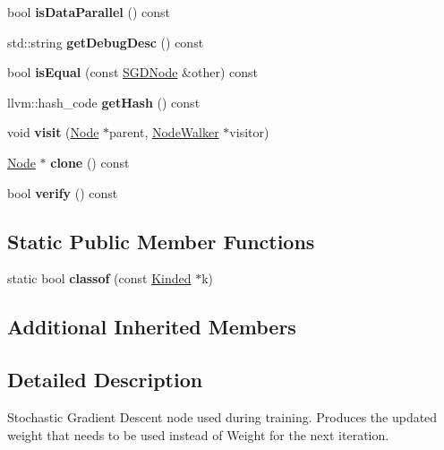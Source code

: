 \begin{DoxyCompactItemize}
bool {\bfseries is\+Data\+Parallel} () const
\item 
\mbox{\label{classglow_1_1_s_g_d_node_a45fc222d05f0ab26e57d92660cd9ac29}} 
std\+::string {\bfseries get\+Debug\+Desc} () const
\item 
\mbox{\label{classglow_1_1_s_g_d_node_acb42ef579603a5da423d0a202ce8ced9}} 
bool {\bfseries is\+Equal} (const \hyperlink{classglow_1_1_s_g_d_node}{S\+G\+D\+Node} \&other) const
\item 
\mbox{\label{classglow_1_1_s_g_d_node_a8c6328b452a05b379208f2a687b0e97f}} 
llvm\+::hash\+\_\+code {\bfseries get\+Hash} () const
\item 
\mbox{\label{classglow_1_1_s_g_d_node_a51274e8bb2edb57a82818a501cd02514}} 
void {\bfseries visit} (\hyperlink{classglow_1_1_node}{Node} $\ast$parent, \hyperlink{classglow_1_1_node_walker}{Node\+Walker} $\ast$visitor)
\item 
\mbox{\label{classglow_1_1_s_g_d_node_a2aa0fac3610c32b2d71cd3f98ec2bbba}} 
\hyperlink{classglow_1_1_node}{Node} $\ast$ {\bfseries clone} () const
\item 
\mbox{\label{classglow_1_1_s_g_d_node_a7b808977c551ee94b295fbc9fd9d7c01}} 
bool {\bfseries verify} () const
\end{DoxyCompactItemize}
\subsection*{Static Public Member Functions}
\begin{DoxyCompactItemize}
\item 
\mbox{\label{classglow_1_1_s_g_d_node_af7708bc0ba6eb17103af56117da616ed}} 
static bool {\bfseries classof} (const \hyperlink{classglow_1_1_kinded}{Kinded} $\ast$k)
\end{DoxyCompactItemize}
\subsection*{Additional Inherited Members}


\subsection{Detailed Description}
Stochastic Gradient Descent node used during training. Produces the updated weight that needs to be used instead of Weight for the next iteration. 

